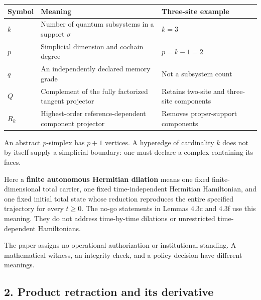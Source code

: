 \documentclass[
  11pt,
]{article}
\begin{document}
\begin{longtable}[]{@{}
  >{\raggedright\arraybackslash}p{}
  >{\raggedright\arraybackslash}p{}
  >{\raggedright\arraybackslash}p{}@{}}
\toprule\noalign{}
\begin{minipage}[b]{\linewidth}\raggedright
Symbol
\end{minipage} & \begin{minipage}[b]{\linewidth}\raggedright
Meaning
\end{minipage} & \begin{minipage}[b]{\linewidth}\raggedright
Three-site example
\end{minipage} \\
\midrule\noalign{}
\endhead
\bottomrule\noalign{}
\endlastfoot
\(k\) & Number of quantum subsystems in a support \(\sigma\) & \(k=3\) \\
\(p\) & Simplicial dimension and cochain degree & \(p=k-1=2\) \\
\(q\) & An independently declared memory grade & Not a subsystem count \\
\(Q\) & Complement of the fully factorized tangent projector & Retains two-site and three-site components \\
\(R_k\) & Highest-order reference-dependent component projector & Removes proper-support components \\
\end{longtable}

An abstract \(p\)-simplex has \(p+1\) vertices. A hyperedge of cardinality \(k\) does not by itself supply a simplicial boundary: one must declare a complex containing its faces.

Here a \textbf{finite autonomous Hermitian dilation} means one fixed
finite-dimensional total carrier, one fixed time-independent Hermitian
Hamiltonian, and one fixed initial total state whose reduction reproduces
the entire specified trajectory for every \(t\ge0\). The no-go statements
in Lemmas 4.3c and 4.3f use this meaning. They do not address time-by-time
dilations or unrestricted time-dependent Hamiltonians.

The paper assigns no operational authorization or institutional standing. A mathematical witness, an integrity check, and a policy decision have different meanings.

\subsection{2. Product retraction and its derivative}\label{product-retraction-and-its-derivative}
\end{document}
